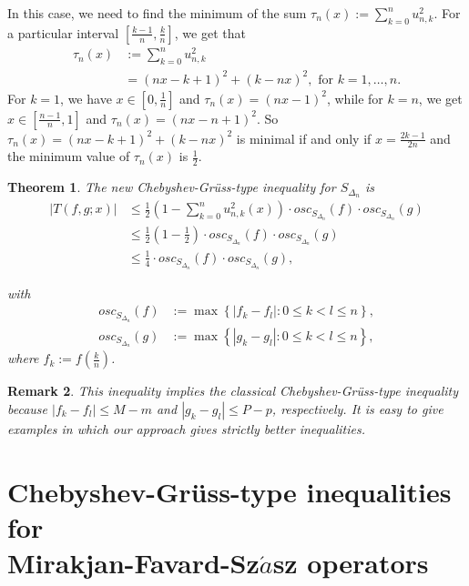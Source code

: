 \documentclass[12pt,leqno,a4paper,dvips,twoside]{article}
\newtheorem{thm}{Theorem}[section]
\newtheorem{rema}[thm]{Remark}%
\begin{document}
{In this case, we need to find the minimum of the sum $\tau_n(x):=\sum^{n}_{k=0}{u^2_{n,k}}$. For a particular interval $\left[\frac{k-1}{n},\frac{k}{n}\right]$, we get that 
	\begin{align*}
		\tau_n(x)&:=\sum^{n}_{k=0}{u^2_{n,k}}\\
				  &=(nx-k+1)^2+(k-nx)^2, \text{ for } k=1,\ldots, n. 
	\end{align*}
For $k=1$, we have $x\in \left[0,\frac{1}{n}\right]$ and $\tau_n(x)=(nx-1)^2$, while for $k=n$, we get $x\in \left[\frac{n-1}{n},1\right]$ and $\tau_n(x)=(nx-n+1)^2$. So $\tau_n(x)=(nx-k+1)^2+(k-nx)^2$ is minimal if and only if
$x=\frac{2k-1}{2n}$ and the minimum value of $\tau_n(x)$ is $\frac{1}{2}$. 

\begin{thm}
The new Chebyshev-Gr\"{u}ss-type inequality for $S_{\Delta_n}$ is 
	\begin{align*}
		\left|T(f,g;x)\right|
		&\leq\frac{1}{2}\left(1-\sum^{n}_{k=0}{u^2_{n,k}(x)}\right)\cdot osc_{S_{\Delta_n}}(f)\cdot osc_{S_{\Delta_n}}(g)\\
		&\leq \frac{1}{2}\left(1-\frac{1}{2}\right)\cdot osc_{S_{\Delta_n}}(f)\cdot osc_{S_{\Delta_n}}(g)\\
		&\leq \frac{1}{4}\cdot osc_{S_{\Delta_n}}(f)\cdot osc_{S_{\Delta_n}}(g),
	\end{align*}

with 	
	\begin{align*}
		osc_{S_{\Delta_n}}(f)&:=\max \left\{\left|f_{k}-f_{l}\right|:0\leq k<l\leq n\right\},\\
		osc_{S_{\Delta_n}}(g)&:=\max \left\{\left|g_{k}-g_{l}\right|:0\leq k<l\leq n\right\},
	\end{align*}
where $f_k:=f\left(\frac{k}{n}\right)$.
\end{thm}

\begin{rema}
	This inequality implies the classical Chebyshev-Gr\"{u}ss-type inequality because
	$\left|f_k-f_l\right|\leq M-m$ and $\left|g_k-g_l\right|\leq P-p$, respectively.  It is easy to give examples in which our
	approach gives strictly better inequalities. 	
\end{rema}

\section{Chebyshev-Gr\"{u}ss-type inequalities for \\ Mirakjan-Favard-Sz$\acute{a}$sz operators}

}
\end{document}
